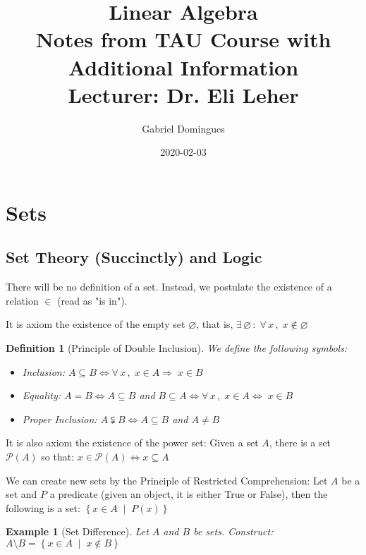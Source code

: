 \documentclass[12pt]{article}
\title{%
  Linear Algebra \\
  \large Notes from TAU Course with Additional Information \\
  Lecturer: Dr. Eli Leher
}
\author{Gabriel Domingues}
\date{2020-02-03}
\let\emptyset\varnothing
\let\RA\Rightarrow
\let\LR\Leftrightarrow
\newcommand{\set}[2]{\left\{{#1}\;\middle|\;{#2}\right\}}
\newcommand{\Forall}[1]{\forall\,{#1}\,,\;}
\newcommand{\Exist}[1]{\exists\,{#1}\,:\;}
\newtheorem{definition}{Definition}[subsection]
\newtheorem{example}{Example}[subsection]
\begin{document}
\maketitle

\setlength{\parindent}{0ex}
\setlength{\parskip}{1em}

\tableofcontents

\doclicenseThis

\pagebreak

\section{Sets}

\subsection{Set Theory (Succinctly) and Logic}

There will be no definition of a set. Instead, we postulate the existence of a relation $\in$ (read as "is in"). 

It is axiom the existence of the empty set $\emptyset$, that is, $\Exist{\emptyset}\Forall{x} x\notin\emptyset$

\begin{definition}[Principle of Double Inclusion]
  We define the following symbols:
  \begin{itemize}
    \item[] Inclusion: $A\subseteq B\LR \Forall{x} x\in A\RA \;x\in B$
    \item[] Equality: $A=B\LR A\subseteq B$ and $B\subseteq A\LR \Forall{x} x\in A\LR \;x\in B$
    \item[] Proper Inclusion: $A\subsetneqq B\LR A\subseteq B$ and $A\neq B$
  \end{itemize}
  
\end{definition}

It is also axiom the existence of the power set: Given a set $A$, there is a set $\mathcal{P}(A)$ so that: $x\in \mathcal{P}(A) \LR x \subseteq A$

We can create new sets by the Principle of Restricted Comprehension: Let $A$ be a set and $P$ a predicate (given an object, it is either True or False), then the following is a set: $\set{x\in A}{P(x)}$

\begin{example}[Set Difference]
  Let $A$ and $B$ be sets. Construct: $A\setminus B=\set{x\in A}{x\notin B}$
\end{example}
\end{document}
